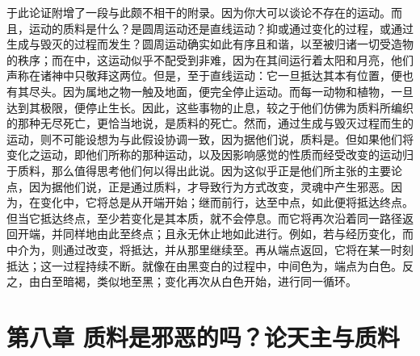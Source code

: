 于此论证附增了一段与此颇不相干的附录。因为你大可以谈论不存在的运动。而且，运动的质料是什么？是圆周运动还是直线运动？抑或通过变化的过程，或通过生成与毁灭的过程而发生？圆周运动确实如此有序且和谐，以至被归诸一切受造物的秩序；而在中，这运动似乎不配受到非难，因为在其间运行着太阳和月亮，他们声称在诸神中只敬拜这两位。但是，至于直线运动：它一旦抵达其本有位置，便也有其尽头。因为属地之物一触及地面，便完全停止运动。而每一动物和植物，一旦达到其极限，便停止生长。因此，这些事物的止息，较之于他们仿佛为质料所编织的那种无尽死亡，更恰当地说，是质料的死亡。然而，通过生成与毁灭过程而生的运动，则不可能设想为与此假设协调一致，因为据他们说，质料是。但如果他们将变化之运动，即他们所称的那种运动，以及因影响感觉的性质而经受改变的运动归于质料，那么值得思考他们何以得出此说。因为这似乎正是他们所主张的主要论点，因为据他们说，正是通过质料，才导致行为方式改变，灵魂中产生邪恶。因为，在变化中，它将总是从开端开始；继而前行，达至中点，如此便将抵达终点。但当它抵达终点，至少若变化是其本质，就不会停息。而它将再次沿着同一路径返回开端，并同样地由此至终点；且永无休止地如此进行。例如，若与经历变化，而中介为，则通过改变，将抵达，并从那里继续至。再从端点返回，它将在某一时刻抵达；这一过程持续不断。就像在由黑变白的过程中，中间色为，端点为白色。反之，由白至暗褐，类似地至黑；变化再次从白色开始，进行同一循环。\par


\section{第八章 质料是邪恶的吗？论天主与质料}

